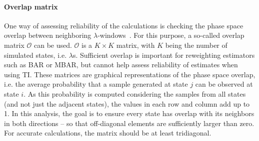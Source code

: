 \documentclass[9pt,bestpractices]{livecoms}
\begin{document}
\paragraph{Overlap matrix}
One way of assessing reliability of the calculations is checking the phase space overlap between neighboring $\lambda$-windows~\cite{wu2005phasespaceb, wu2005phasespacec}. For this purpose, a so-called overlap matrix $\mathcal{O}$ can be used.  $\mathcal{O}$ is a $K\times K$ matrix, with $K$ being the number of simulated states, i.e. $\lambda$s. Sufficient overlap is important for reweighting estimators such as BAR or MBAR, but cannot help assess reliability of estimates when using TI. 
These matrices are graphical representations of the phase space overlap, i.e. the average probability that a sample generated at state $j$ can be observed at state $i$. As this probability is computed considering the samples from all states (and not just the adjacent states), the values in each row and column add up to 1. In this analysis, the goal is to ensure every state has overlap with its neighbors in both directions -- so that off-diagonal elements are sufficiently larger than zero. For accurate calculations, the matrix should be at least tridiagonal.
\end{document}
